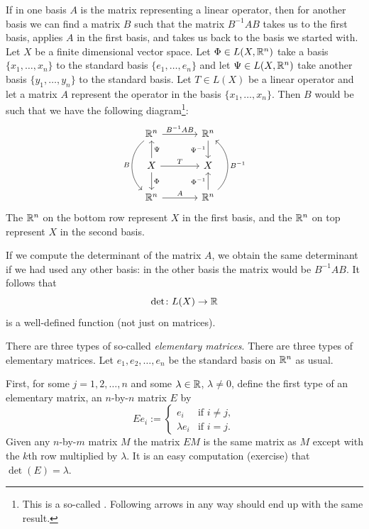 If in one basis $A$ is the matrix representing a
linear operator, then for another basis we can find a matrix $B$ such
that the matrix $B^{-1}AB$ takes us to the first basis, applies $A$ in the
first basis, and takes us back to the basis we started with.
Let $X$ be a finite dimensional vector space.
Let $\Phi \in L(X,{\mathbb{R}}^n)$ take a basis $\{ x_1,\ldots,x_n \}$ to the
standard basis $\{ e_1,\ldots,e_n \}$ and let $\Psi \in L(X,{\mathbb{R}}^n)$
take another basis $\{ y_1, \ldots, y_n \}$ to the standard basis.
Let $T \in L(X)$ be a linear operator and let a matrix $A$
represent the operator
in the basis $\{ x_1,\ldots,x_n \}$.
Then $B$ would be such that we have the following diagram\footnote{%
This is a so-called \emph{}.
Following arrows in any way should end up with the same result.}:
\begin{equation*}
\begin{tikzcd}[row sep=normal,column sep=large]
\R^n \ar[r, "B^{-1}AB"]  \ar[dd, bend right=50, "B"'] &
  \R^n \ar[d, "\Psi^{-1}"'] \\
X \ar[r, "T"] \ar[u, "\Psi"'] \ar[d, "\Phi"]        &
  X \\
\R^n \ar[r, "A"]                                      &
  \R^n \ar[u, "\Phi^{-1}"] \ar[uu, bend right=50, "B^{-1}"'] 
\end{tikzcd}
\end{equation*}
The ${\mathbb{R}}^n$ on the bottom row represent
$X$ in the first basis, and the ${\mathbb{R}}^n$ on top represent $X$ in the
second
basis.

If we compute the determinant of the matrix $A$, we obtain
the same determinant if we had used any other basis:
in the other basis the matrix would be $B^{-1}AB$.
It follows that
\begin{equation*}
\det \colon L(X) \to {\mathbb{R}}
\end{equation*}
is a well-defined function (not just on matrices).

\medskip

There are three types of so-called
\emph{elementary matrices}.
There are three types of elementary matrices.
Let
$e_1,e_2,\ldots,e_n$ be the standard basis on ${\mathbb{R}}^n$ as usual.

First,
for some $j =
1,2,\ldots,n$ and
some $\lambda \in {\mathbb{R}}$, $\lambda \neq 0$, define
the first type of an elementary matrix,
an
$n$-by-$n$ matrix $E$ by
\begin{equation*}
Ee_i := 
\begin{cases}
e_i & \text{if $i \neq j$} , \\
\lambda e_i & \text{if $i = j$} .
\end{cases}
\end{equation*}
Given any $n$-by-$m$ matrix $M$ the matrix $EM$ is the same matrix as $M$
except with the $k$th row multiplied by $\lambda$.
It is an easy computation (exercise) that $\det(E) = \lambda$.

